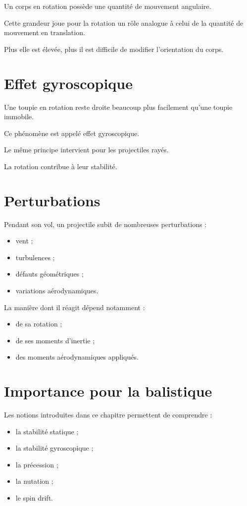 Un corps en rotation possède une quantité de mouvement angulaire.

Cette grandeur joue pour la rotation un rôle analogue à celui de la quantité
de mouvement en translation.

Plus elle est élevée, plus il est difficile de modifier l'orientation du
corps.

\section{Effet gyroscopique}

Une toupie en rotation reste droite beaucoup plus facilement qu'une toupie
immobile.

Ce phénomène est appelé effet gyroscopique.

Le même principe intervient pour les projectiles rayés.

La rotation contribue à leur stabilité.

\section{Perturbations}

Pendant son vol, un projectile subit de nombreuses perturbations :

\begin{itemize}
    \item vent ;
    \item turbulences ;
    \item défauts géométriques ;
    \item variations aérodynamiques.
\end{itemize}

La manière dont il réagit dépend notamment :

\begin{itemize}
    \item de sa rotation ;
    \item de ses moments d'inertie ;
    \item des moments aérodynamiques appliqués.
\end{itemize}

\section{Importance pour la balistique}

Les notions introduites dans ce chapitre permettent de comprendre :

\begin{itemize}
    \item la stabilité statique ;
    \item la stabilité gyroscopique ;
    \item la précession ;
    \item la nutation ;
    \item le spin drift.
\end{itemize}

